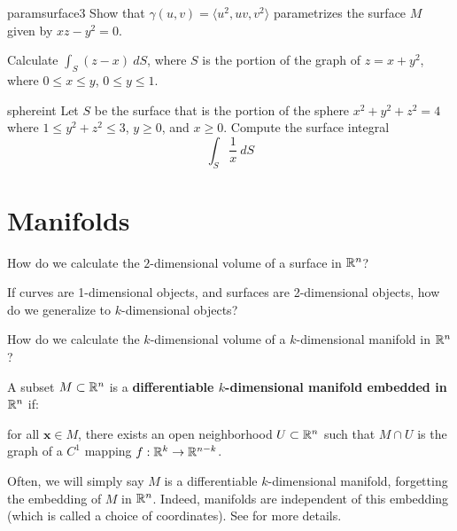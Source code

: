 \begin{problem}{paramsurface3}
     Show that $\gamma(u,v) = \langle u^2, uv, v^2 \rangle$ parametrizes the surface $M$ given by $xz-y^2 = 0$. 
\end{problem}

\begin{problem}
    Calculate $\int_S (z-x) \ dS$, where $S$ is the portion of the graph of $z = x + y^2$, where $0 \leq x \leq y$, $0 \leq y \leq 1$.
\end{problem}

\begin{problem}{sphereint}
    Let $S$ be the surface that is the portion of the sphere $x^2 + y^2 + z^2 = 4$ where $1 \leq y^2 + z^2 \leq 3$, $y \geq 0$, and $x \geq 0$. Compute the surface integral $$\int_S \frac{1}{x} \ dS$$
\end{problem}


\section{Manifolds}

    \begin{motivating}
    How do we calculate the $2$-dimensional volume of a surface in $\mathbb{R}^n$?
    \end{motivating}

    \begin{motivating}
    If curves are 1-dimensional objects, and surfaces are 2-dimensional objects, how do we generalize to $k$-dimensional objects?
    \end{motivating}

    \begin{motivating}
    How do we calculate the $k$-dimensional volume of a $k$-dimensional manifold in $\mathbb{R}^n$?
    \end{motivating}


\begin{definition}
    A subset $M \subset \mathbb{R}^n$ is a \textbf{differentiable $k$-dimensional manifold embedded in $\mathbb{R}^n$}  if:
    
    for all $\bm{x} \in M$, there exists an open neighborhood $U \subset \mathbb{R}^n$ such that $M \cap U$ is the graph of a $C^1$ mapping $f: \mathbb{R}^k \to \mathbb{R}^{n-k}$.
    
    \end{definition}

Often, we will simply say $M$ is a differentiable $k$-dimensional manifold, forgetting the embedding of $M$ in $\mathbb{R}^n$.  Indeed, manifolds are independent of this embedding (which is called a choice of coordinates).  See  for more details.

